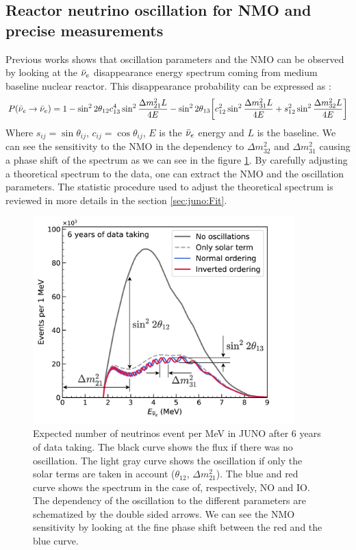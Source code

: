 \documentclass[../main.tex]{subfiles}
\begin{document}
\subsection{Reactor neutrino oscillation for NMO and precise measurements}
\label{sec:juno:nom_precise_measurement}
Previous works \cite{zhan_determination_2008,  zhan_experimental_2009} shows that oscillation parameters and the NMO can be observed by looking at the $\bar{\nu}_{e}$ disappearance energy spectrum coming from medium baseline nuclear reactor. This disappearance probability can be expressed as \cite{an_neutrino_2016} :
\begin{equation*}
  P(\bar{\nu}_{e} \rightarrow \bar{\nu}_{e}) = 1 - \sin^2 2\theta_{12} c^4_{13} \sin^2 \frac{\Delta m^2_{21}L}{4E} - \sin^2 2\theta_{13} \bigg[ c_{12}^2 \sin^2 \frac{\Delta m_{31}^2 L}{4E} + s^2_{12} \sin^2 \frac{\Delta m_{32}^2 L}{4E} \bigg]
\end{equation*}
Where $s_{ij} = \sin \theta_{ij}$, $c_{ij} = \cos \theta_{ij}$, $E$ is the $\bar{\nu}_{e}$ energy and $L$ is the baseline.
We can see the sensitivity to the NMO in the dependency to $\Delta m_{32}^2$ and $\Delta m^2_{31}$ causing a phase shift of the spectrum as we can see in the figure \ref{fig:juno:juno-spectrum-oscillation}.
By carefully adjusting a theoretical spectrum to the data, one can extract the NMO and the oscillation parameters. The statistic procedure used to adjust the theoretical spectrum is reviewed in more details in the section \ref{sec:juno:Fit}.
\begin{figure}
  \centering
  \includegraphics[height=8cm]{images/juno/Spectrum-OscillationsOnly_dm2_31.png}
  \caption{Expected number of neutrinos event per MeV in JUNO after 6 years of data taking. The black curve shows the flux if there was no oscillation. The light gray curve shows the oscillation if only the solar terms are taken in account ($\theta_{12}$, $\Delta m_{21}^2$). The blue and red curve shows the spectrum in the case of, respectively, NO and IO. The dependency of the oscillation to the different parameters are schematized by the double sided arrows. We can see the NMO sensitivity by looking at the fine phase shift between the red and the blue curve.}
  \label{fig:juno:juno-spectrum-oscillation}
\end{figure}
\end{document}
